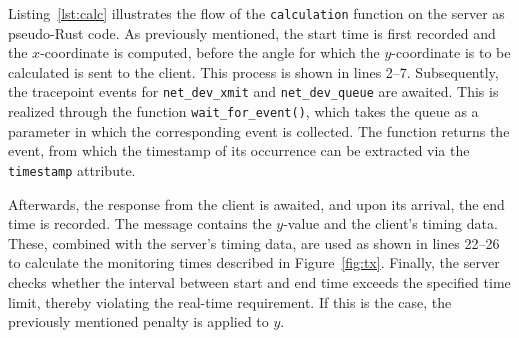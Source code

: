 Listing~\ref{lst:calc} illustrates the flow of the \texttt{calculation} function on the server as pseudo-Rust code.  
As previously mentioned, the start time is first recorded and the $x$-coordinate is computed, before the angle for which the $y$-coordinate is to be calculated is sent to the client.  
This process is shown in lines 2--7.  
Subsequently, the tracepoint events for \texttt{net\_dev\_xmit} and \texttt{net\_dev\_queue} are awaited.  
This is realized through the function \texttt{wait\_for\_event()}, which takes the queue as a parameter in which the corresponding event is collected.  
The function returns the event, from which the timestamp of its occurrence can be extracted via the \texttt{timestamp} attribute.

Afterwards, the response from the client is awaited, and upon its arrival, the end time is recorded.  
The message contains the $y$-value and the client's timing data.  
These, combined with the server's timing data, are used as shown in lines 22--26 to calculate the monitoring times described in Figure~\ref{fig:tx}.  
Finally, the server checks whether the interval between start and end time exceeds the specified time limit, thereby violating the real-time requirement.  
If this is the case, the previously mentioned penalty is applied to $y$.  

